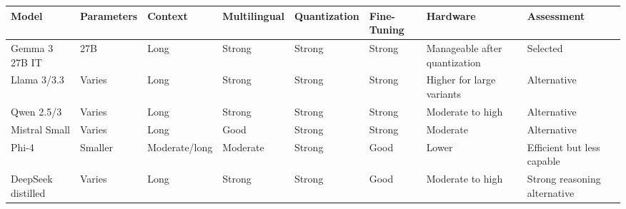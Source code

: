 \documentclass[
  letterpaper,
  12pt,
  a4paper,
  openany]{report}
\newcounter{none} %
\begin{document}
{\def\LTcaptype{none} %
\begin{longtable}[]{@{}
  >{\raggedright\arraybackslash}p{}
  >{\raggedright\arraybackslash}p{}
  >{\raggedright\arraybackslash}p{}
  >{\raggedright\arraybackslash}p{}
  >{\raggedright\arraybackslash}p{}
  >{\raggedright\arraybackslash}p{}
  >{\raggedright\arraybackslash}p{}
  >{\raggedright\arraybackslash}p{}@{}}
\toprule\noalign{}
\begin{minipage}[b]{\linewidth}\raggedright
Model
\end{minipage} & \begin{minipage}[b]{\linewidth}\raggedright
Parameters
\end{minipage} & \begin{minipage}[b]{\linewidth}\raggedright
Context
\end{minipage} & \begin{minipage}[b]{\linewidth}\raggedright
Multilingual
\end{minipage} & \begin{minipage}[b]{\linewidth}\raggedright
Quantization
\end{minipage} & \begin{minipage}[b]{\linewidth}\raggedright
Fine-Tuning
\end{minipage} & \begin{minipage}[b]{\linewidth}\raggedright
Hardware
\end{minipage} & \begin{minipage}[b]{\linewidth}\raggedright
Assessment
\end{minipage} \\
\midrule\noalign{}
\endhead
\bottomrule\noalign{}
\endlastfoot
Gemma 3 27B IT & 27B & Long & Strong & Strong & Strong & Manageable
after quantization & Selected \\
Llama 3/3.3 & Varies & Long & Strong & Strong & Strong & Higher for
large variants & Alternative \\
Qwen 2.5/3 & Varies & Long & Strong & Strong & Strong & Moderate to high
& Alternative \\
Mistral Small & Varies & Long & Good & Strong & Strong & Moderate &
Alternative \\
Phi-4 & Smaller & Moderate/long & Moderate & Strong & Good & Lower &
Efficient but less capable \\
DeepSeek distilled & Varies & Long & Strong & Strong & Good & Moderate
to high & Strong reasoning alternative \\
\end{longtable}
}
\end{document}
